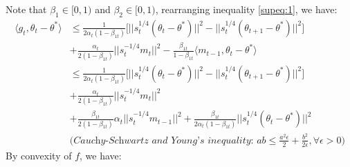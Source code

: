 \documentclass{article}
\begin{document}
Note that $\beta_1 \in [0,1)$ and $\beta_2 \in [0,1)$, rearranging inequality \eqref{supeq:1}, we have:
\begin{align}
\label{supeq:2}
    \langle g_t, \theta_t - \theta^* \rangle & \leq \frac{1}{2 \alpha_t (1 - \beta_{1t})} \Big [ \Big \vert \Big \vert s_t^{1/4}(\theta_t - \theta^*)\Big \vert \Big \vert^2 - \Big \vert \Big \vert s_t^{1/4} (\theta_{t+1} - \theta^*) \Big \vert \Big \vert^2 \Big ] \nonumber \\
    &+ \frac{\alpha_t}{2(1-\beta_{1t})} \Big \vert \Big \vert s_t^{-1/4} m_t\Big \vert \Big \vert^2 - \frac{\beta_{1t}}{1 - \beta_{1t}} \langle m_{t-1}, \theta_t - \theta^* \rangle \nonumber \\
    & \leq \frac{1}{2 \alpha_t (1 - \beta_{1t})} \Big [ \Big \vert \Big \vert s_t^{1/4}(\theta_t - \theta^*)\Big \vert \Big \vert^2 - \Big \vert \Big \vert s_t^{1/4} (\theta_{t+1} - \theta^*) \Big \vert \Big \vert^2 \Big ] \nonumber \\
    &+ \frac{\alpha_t}{2(1-\beta_{1t})} \Big \vert \Big \vert s_t^{-1/4} m_t\Big \vert \Big \vert^2 \nonumber \\
    &+ \frac{\beta_{1t}}{2(1-\beta_{1t})} \alpha_t \Big \vert \Big \vert s_t^{-1/4} m_{t-1} \Big \vert \Big \vert^2 +
    \frac{\beta_{1t}}{2 \alpha_t (1 - \beta_{1t})} \Big \vert \Big \vert s_t^{1/4} (\theta_t - \theta^*) \Big \vert \Big \vert^2 \nonumber \\
    &\Big (\textit{Cauchy-Schwartz and Young's inequality: } ab \leq \frac{a^2 \epsilon}{2} + \frac{b^2}{ 2 \epsilon}, \forall \epsilon > 0 \Big )
\end{align}
By convexity of $f$, we have:
\end{document}
